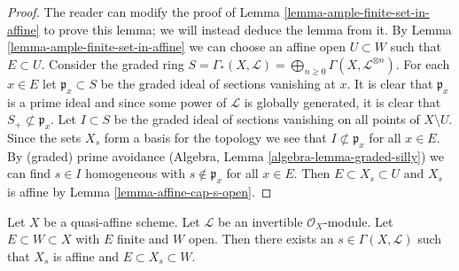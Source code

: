 \begin{proof}
The reader can modify the proof of Lemma \ref{lemma-ample-finite-set-in-affine}
to prove this lemma; we will instead deduce the lemma from it.
By Lemma \ref{lemma-ample-finite-set-in-affine} we can choose an affine
open $U \subset W$ such that $E \subset U$.
Consider the graded ring $S = \Gamma_*(X, \mathcal{L}) =
\bigoplus_{n \geq 0} \Gamma(X, \mathcal{L}^{\otimes n})$.
For each $x \in E$ let $\mathfrak p_x \subset S$ be the graded ideal
of sections vanishing at $x$. It is clear that $\mathfrak p_x$ is
a prime ideal and since some power of $\mathcal{L}$ is globally
generated, it is clear that $S_{+} \not \subset \mathfrak p_x$.
Let $I \subset S$ be the graded ideal of sections vanishing on all
points of $X \setminus U$. Since the sets $X_s$ form a basis
for the topology we see that $I \not \subset \mathfrak p_x$ for
all $x \in E$.
By (graded) prime avoidance (Algebra, Lemma \ref{algebra-lemma-graded-silly})
we can find $s \in I$ homogeneous
with $s \not \in \mathfrak p_x$ for all $x \in E$.
Then $E \subset X_s \subset U$ and $X_s$ is affine by
Lemma \ref{lemma-affine-cap-s-open}.
\end{proof}

\begin{lemma}
\label{lemma-quasi-affine-invertible-nonvanishing-section}
Let $X$ be a quasi-affine scheme. Let $\mathcal{L}$ be an invertible
$\mathcal{O}_X$-module. Let $E \subset W \subset X$ with $E$ finite
and $W$ open. Then there exists an $s \in \Gamma(X, \mathcal{L})$
such that $X_s$ is affine and $E \subset X_s \subset W$.
\end{lemma}

